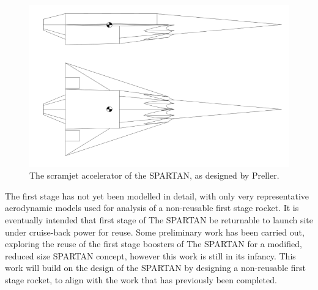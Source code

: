 \begin{figure}[ht]
\centering
\includegraphics[width=0.7\linewidth]{figures/2_literature-review/SPARTAN-Dawid}
\caption{The scramjet accelerator of the SPARTAN, as designed by Preller\cite{Preller2018a}.}
\label{fig:SPARTAN-Dawid}
\end{figure}


The first stage has not yet been modelled in detail, with only very representative aerodynamic models used for analysis of a non-reusable first stage rocket.
It is eventually intended that first stage of The SPARTAN be returnable to launch site under cruise-back power for reuse. Some preliminary work has been carried out, exploring the reuse of the first stage boosters of The SPARTAN \cite{chai2017} for a modified, reduced size SPARTAN concept, however this work is still in its infancy. 
 This work will build on the design of the SPARTAN by designing a non-reusable first stage rocket, to align with the work that has previously been completed\cite{Preller2017b}. 


